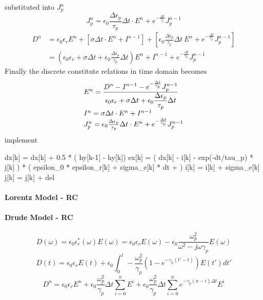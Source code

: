 substituted into $J_p^n$
\begin{equation}
  J_p^n = \epsilon_0\frac{\Delta\epsilon_p}{\tau_p}\Delta t\cdot E^n + e^{-\frac{\Delta t}{\tau_p}} J_p^{n-1}
\end{equation}
\begin{equation}
  \begin{split}
    D^n & = \epsilon_0 \epsilon_r E^n + \left[\sigma \Delta t\cdot E^n + I^{n-1}\right] + \left[\epsilon_0 \frac{\Delta \epsilon_p}{\tau_p}\Delta t\ E^n + e^{-\frac{\Delta t}{\tau_p}} J_p^{n-1}\right]\\
    & = \left(\epsilon_0 \epsilon_r + \sigma \Delta t + \epsilon_0 \frac{\Delta \epsilon_p}{\tau_p} \Delta t\right)E^n + I^{n-1} + e^{-\frac{\Delta t}{\tau_p}} J_p^{n-1}
  \end{split}
\end{equation}
Finally the discrete constitute relations in time domain becomes
\begin{gather}
  \begin{array}{@{}l@{}}
    E^n =  \frac{\displaystyle D^n - I^{n-1} - e^{-\frac{\Delta t}{\tau_p}}J_p^{n-1} }{\displaystyle\epsilon_0 \epsilon_r + \sigma \Delta t + \epsilon_0 \frac{\Delta \epsilon_p}{\tau_p} \Delta t}\\    
    I^n = \sigma\Delta t\cdot E^n + I^{n-1}\\
    J_p^n = \epsilon_0\frac{\Delta\epsilon_p}{\tau_p}\Delta t\cdot E^n + e^{-\frac{\Delta t}{\tau_p}} J_p^{n-1}
  \end{array}
\end{gather}
implement
\begin{code}
  dx[k] = dx[k] + 0.5 * ( hy[k-1] - hy[k])
  ex[k] = ( dx[k] - i[k] - exp(-dt/tau_p) * j[k] ) 
  * ( epsilon_0 * epsilon_r[k] + sigma_e[k] * dt +  )
  i[k] = i[k] + sigma_e[k] 
  j[k] = j[k] + del
\end{code}






\paragraph{{\msjh Lorentz Model - RC}}


\paragraph{{\msjh Drude Model - RC}}
\begin{equation}
  D(\omega) = \epsilon_0\epsilon_r^*(\omega)E(\omega) = \epsilon_0\epsilon_rE(\omega) - \epsilon_0\frac{\omega_p^2}{\omega^2-j\omega\gamma_p}E(\omega)
\end{equation}
\begin{equation}
  D(t) = \epsilon_0\epsilon_rE(t) + \epsilon_0\int_0^t -\frac{\omega_p^2}{\gamma_p}(1 - e^{-\gamma_p(t'-t)})E(t')dt'
\end{equation}
\begin{equation}
  D^n = \epsilon_0\epsilon_rE^n + \epsilon_0\frac{\omega_p^2}{\gamma_p}\Delta t\sum_{i=0}^{n}E^i + \epsilon_0\frac{\omega_p^2}{\gamma_p}\Delta t \sum_{i=0}^{n}e^{-\gamma_p(n-i)\Delta t} E^i
\end{equation}



